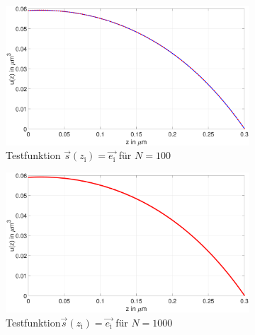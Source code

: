 \begin{figure}
	\begin{subfigure}[b]{.5\textwidth}
	
			\includegraphics[width=1\linewidth]{figures/station_gl_2_1/aufgabe_7_test_100}
			\caption{Testfunktion	$\vec{s}(z_\mathrm{i})=\vec{e_\mathrm{i}}$ für $N=100$}
		\end{subfigure}
	\begin{subfigure}[b]{.5\textwidth}
			\centering
	
			\includegraphics[width=1\linewidth]{figures/station_gl_2_1/aufgabe_7_test_n1000}
			\caption{Testfunktion$\vec{s}(z_\mathrm{i})=\vec{e_\mathrm{i}}$ für $N=1000$}
		\end{subfigure}
	\newline
	\begin{subfigure}[b]{.5\textwidth}
			\centering
	

\end{subfigure}
\end{figure}
